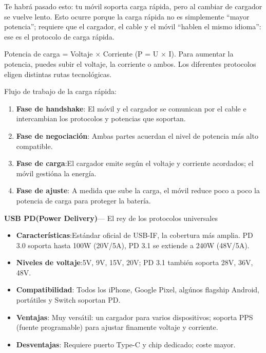 
Te habrá pasado esto: tu móvil soporta carga rápida, pero al cambiar de cargador se vuelve lento. Esto ocurre porque la carga rápida no es simplemente “mayor potencia”; requiere que el cargador, el cable y el móvil “hablen el mismo idioma”: ese es el protocolo de carga rápida.


Potencia de carga = Voltaje × Corriente (P = U × I). Para aumentar la potencia, puedes subir el voltaje, la corriente o ambos. Los diferentes protocolos eligen distintas rutas tecnológicas.

Flujo de trabajo de la carga rápida:

\begin{enumerate}
  \item \textbf{Fase de handshake}: El móvil y el cargador se comunican por el cable e intercambian los protocolos y potencias que soportan.
  \item \textbf{Fase de negociación}: Ambas partes acuerdan el nivel de potencia más alto compatible.
  \item \textbf{Fase de carga}:El cargador emite según el voltaje y corriente acordados; el móvil gestióna la energía.
  \item \textbf{Fase de ajuste}: A medida que sube la carga, el móvil reduce poco a poco la potencia de carga para proteger la batería.
\end{enumerate}


\textbf{USB PD(Power Delivery)}— El rey de los protocolos universales

\begin{itemize}
  \item \textbf{Características}:Estándar oficial de USB-IF, la cobertura más amplia. PD 3.0 soporta hasta 100W (20V/5A), PD 3.1 se extiende a 240W (48V/5A).
  \item \textbf{Niveles de voltaje}:5V, 9V, 15V, 20V; PD 3.1 también soporta 28V, 36V, 48V.
  \item \textbf{Compatibilidad}: Todos los iPhone, Google Pixel, algúnos flagship Android, portátiles y Switch soportan PD.
  \item \textbf{Ventajas}: Muy versátil: un cargador para varios dispositivos; soporta PPS (fuente programable) para ajustar finamente voltaje y corriente.
  \item \textbf{Desventajas}: Requiere puerto Type-C y chip dedicado; coste mayor.
\end{itemize}

